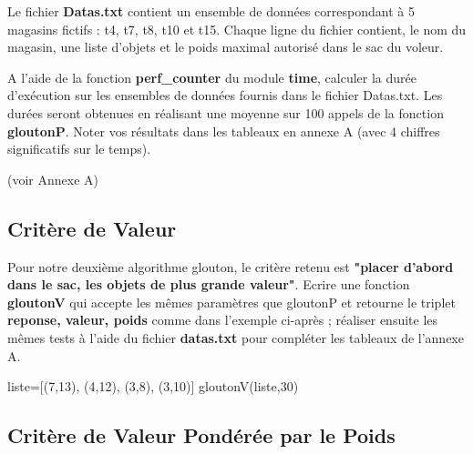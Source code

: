 \documentclass[a4paper,11,answers
]{exam}
\begin{document}
\begin{questions}
Le fichier \textbf{Datas.txt} contient un ensemble de données correspondant à 5 magasins fictifs : t4, t7, t8, t10 et t15. Chaque ligne du fichier contient, le nom du magasin, une liste d'objets et le poids maximal autorisé dans le sac du voleur.

\question A l'aide de la fonction \textbf{perf\_counter} du module \textbf{time}, calculer la durée d'exécution sur les ensembles de données fournis dans le fichier Datas.txt. Les durées seront obtenues en réalisant une moyenne sur 100 appels de la fonction  \textbf{gloutonP}. Noter vos résultats dans les tableaux en annexe A (avec 4 chiffres significatifs sur le temps). 
\begin{solution}
(voir Annexe A) 
\end{solution}
 \subsection{Critère de Valeur}
  Pour notre deuxième algorithme glouton, le critère retenu est \textbf{"placer d'abord dans le sac, les objets de plus grande valeur"}. Ecrire une fonction \textbf{gloutonV} qui accepte les mêmes paramètres que gloutonP et retourne le triplet \textbf{reponse, valeur, poids} comme dans l'exemple ci-après ; réaliser ensuite les mêmes tests à l'aide du fichier  \textbf{datas.txt} pour compléter les tableaux de l'annexe A.
  \vspace{3mm}

\begin{tcolorbox}[enhanced,attach boxed title to top center={yshift=-3mm,yshifttext=-1mm},
  colback=green!5!white,colframe=green!75!black,colbacktitle=green!25!black,
  title=Console Python, fonttitle=\bfseries,
  boxed title style={size=small,colframe=blue!25!black} ]
\begin{pyconsole}
liste=[(7,13), (4,12), (3,8), (3,10)]
gloutonV(liste,30)
\end{pyconsole}
\end{tcolorbox}

\subsection{Critère de Valeur Pondérée par le Poids}


\end{questions}
\end{document}
